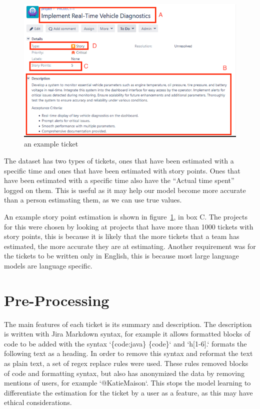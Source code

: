 \documentclass{UoYCSproject}
\begin{document}
    \begin{figure}[h]
        \includegraphics[width=\textwidth]{./figures/dummy-ticket}
        \caption{an example ticket}
        \label{fig:ticket}
    \end{figure}

    The dataset has two types of tickets, ones that have been estimated with a specific time and ones that have been estimated with story points.
    Ones that have been estimated with a specific time also have the ``Actual time spent'' logged on them.
    This is useful as it may help our model become more accurate than a person estimating them, as we can use true values. \par
    An example story point estimation is shown in figure~\ref{fig:ticket}, in box C.
    The projects for this were chosen by looking at projects that have more than 1000 tickets with story points, this is because it is likely that the more tickets that a team has estimated, the more accurate they are at estimating.
    Another requirement was for the tickets to be written only in English, this is because most large language models are language specific.


    \section{Pre-Processing}\label{sec:preprocessing}

    The main features of each ticket is its summary and description.
    The description is written with Jira Markdown syntax, for example it allows formatted blocks of code to be added with the syntax `\{code:java\} \{code\}` and `h[1-6].` formats the following text as a heading.
    In order to remove this syntax and reformat the text as plain text, a set of regex replace rules were used.
    These rules removed blocks of code and formatting syntax, but also has anonymized the data by removing mentions of users, for example `@KatieMaison`.
    This stops the model learning to differentiate the estimation for the ticket by a user as a feature, as this may have ethical considerations. \par
\end{document}
